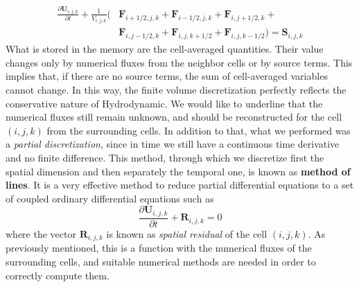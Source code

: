 \begin{equation}
\begin{split}
	\frac{\partial \mathbf{U}_{i, j, k}}{\partial t} + \frac{1}{V_{i, j, k}} ( & \mathbf{F}_{i + 1/2, j, k} + \mathbf{F}_{i - 1/2, j, k} +\mathbf{F}_{i , j + 1/2, k} + \\
	& \mathbf{F}_{i , j - 1/2, k} +  \mathbf{F}_{i , j, k + 1/2} + \mathbf{F}_{i , j, k - 1/2}) = \mathbf{S}_{i, j, k}
\end{split}
\end{equation}
What is stored in the memory are the cell-averaged quantities. Their value changes only by numerical fluxes from the neighbor cells or by source terms. This implies that, if there are no source terms, the sum of cell-averaged variables cannot change. In this way, the finite volume discretization perfectly reflects the conservative nature of Hydrodynamic. We would like to underline that the numerical fluxes still remain unknown, and should be reconstructed for the cell $(i, j, k)$ from the surrounding cells. In addition to that, what we performed was a \textit{partial discretization}, since in time we still have a continuous time derivative and no finite difference. This method, through which we discretize first the spatial dimension and then separately the temporal one, is known as \textbf{method of lines}. It is a very effective method to reduce partial differential equations to a set of coupled ordinary differential equations such as
\begin{equation}\label{eq:methodoflines}
	\frac{\partial \mathbf{U}_{i, j, k}}{\partial t} + \mathbf{R}_{i, j, k}=0
\end{equation}
where the vector $\mathbf{R}_{i, j, k}$ is known as \textit{spatial residual} of the cell $(i, j, k)$. As previously mentioned, this is a function with the numerical fluxes of the surrounding cells, and suitable numerical methods are needed in order to correctly compute them.
